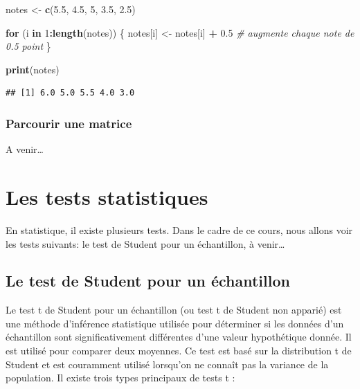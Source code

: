 \documentclass[
]{book}
\newenvironment{Shaded}{\begin{snugshade}}{\end{snugshade}}
\newcommand{\CommentTok}[1]{\textcolor[rgb]{0.56,0.35,0.01}{\textit{#1}}}
\newcommand{\ControlFlowTok}[1]{\textcolor[rgb]{0.13,0.29,0.53}{\textbf{#1}}}
\newcommand{\DecValTok}[1]{\textcolor[rgb]{0.00,0.00,0.81}{#1}}
\newcommand{\FloatTok}[1]{\textcolor[rgb]{0.00,0.00,0.81}{#1}}
\newcommand{\FunctionTok}[1]{\textcolor[rgb]{0.13,0.29,0.53}{\textbf{#1}}}
\newcommand{\NormalTok}[1]{#1}
\newcommand{\OtherTok}[1]{\textcolor[rgb]{0.56,0.35,0.01}{#1}}
\newcommand{\SpecialCharTok}[1]{\textcolor[rgb]{0.81,0.36,0.00}{\textbf{#1}}}
\begin{document}
\begin{Shaded}
\begin{Highlighting}[]
\NormalTok{notes }\OtherTok{\textless{}{-}} \FunctionTok{c}\NormalTok{(}\FloatTok{5.5}\NormalTok{, }\FloatTok{4.5}\NormalTok{, }\DecValTok{5}\NormalTok{, }\FloatTok{3.5}\NormalTok{, }\FloatTok{2.5}\NormalTok{)}

\ControlFlowTok{for}\NormalTok{ (i }\ControlFlowTok{in} \DecValTok{1}\SpecialCharTok{:}\FunctionTok{length}\NormalTok{(notes)) \{}
\NormalTok{  notes[i] }\OtherTok{\textless{}{-}}\NormalTok{ notes[i] }\SpecialCharTok{+} \FloatTok{0.5}  \CommentTok{\# augmente chaque note de 0.5 point}
\NormalTok{\}}

\FunctionTok{print}\NormalTok{(notes)}
\end{Highlighting}
\end{Shaded}

\begin{verbatim}
## [1] 6.0 5.0 5.5 4.0 3.0
\end{verbatim}

\subsection{Parcourir une matrice}\label{parcourir-une-matrice}

A venir\ldots{}

\chapter{Les tests statistiques}\label{les-tests-statistiques}

En statistique, il existe plusieurs tests. Dans le cadre de ce cours, nous allons voir les tests suivants: le test de Student pour un échantillon, à venir\ldots{}

\section{Le test de Student pour un échantillon}\label{le-test-de-student-pour-un-uxe9chantillon}

Le test t de Student pour un échantillon (ou test t de Student non apparié) est une méthode d'inférence statistique utilisée pour déterminer si les données d'un échantillon sont significativement différentes d'une valeur hypothétique donnée. Il est utilisé pour comparer deux moyennes. Ce test est basé sur la distribution t de Student et est couramment utilisé lorsqu'on ne connaît pas la variance de la population. Il existe trois types principaux de tests t :
\end{document}
